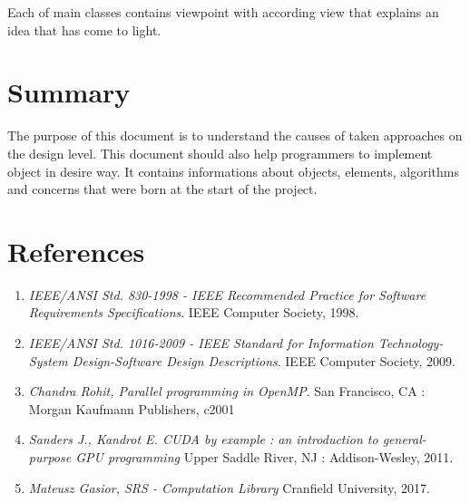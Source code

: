 	Each of main classes contains viewpoint with according view that explains an idea that has come to light.
\section{Summary} \label{s:introduction:summary}
	\begin{comment}
		Brief summary of the document.
	\end{comment}
	The purpose of this document is to understand the causes of taken approaches on the design level. This document should also help programmers to implement object in desire way. It contains informations about objects, elements, algorithms and concerns that were born at the start of the project.
\section{References} \label{s:introduction:references}
	\begin{comment}
		$<$List any other documents or Web addresses to which this SRS refers. These may 
		include user interface style guides, contracts, standards, system requirements 
		specifications, use case documents, or a vision and scope document. Provide 
		enough information so that the reader could access a copy of each reference, 
		including title, author, version number, date, and source or location.$>$
	\end{comment}
	
	\begin{enumerate}
		\item \emph{IEEE/ANSI Std. 830-1998 - IEEE Recommended Practice for Software Requirements Specifications}. IEEE Computer Society, 1998.
		\item \emph{IEEE/ANSI Std. 1016-2009 - IEEE Standard for Information Technology-System Design-Software Design Descriptions}. IEEE Computer Society, 2009.
		\item \emph{Chandra Rohit, Parallel programming in OpenMP}. San Francisco, CA : Morgan Kaufmann Publishers, c2001
		\item \emph{Sanders J., Kandrot E. CUDA by example : an introduction to general-purpose GPU programming} Upper Saddle River, NJ : Addison-Wesley, 2011.
		\item \emph{Mateusz Gasior, SRS - Computation Library} Cranfield University, 2017.
	\end{enumerate}
